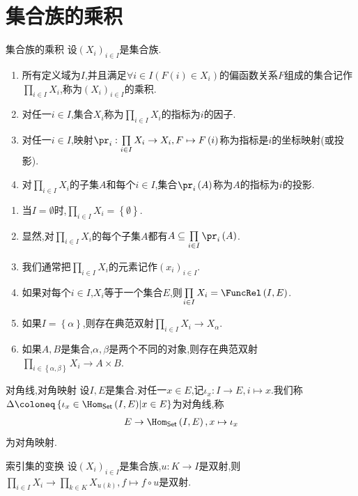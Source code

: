 \section{集合族的乘积}

\begin{definition}{集合族的乘积}{}
	设$\left(X_{i}\right)_{i\in I}$是集合族.
	\begin{enumerate}
		\item 所有定义域为$I$,并且满足$\forall i\in I\left(F\left(i\right)\in X_{i}\right)$的偏函数关系$F$组成的集合记作$\prod\limits_{i\in I}X_{i}$,称为$\left(X_{i}\right)_{i\in I}$的乘积.
		\item 对任一$i\in I$,集合$X_{i}$称为$\prod\limits_{i\in I}X_{i}$的指标为$i$的因子.
		\item 对任一$i\in I$,映射$\pr_{i}:\prod\limits_{i\in I}X_{i}\to X_{i},F\mapsto F\left(i\right)$称为指标是$i$的坐标映射(或投影).
		\item 对$\prod\limits_{i\in I}X_{i}$的子集$A$和每个$i\in I$,集合$\pr_{i}\left(A\right)$称为$A$的指标为$i$的投影.
	\end{enumerate}
\end{definition}

\begin{remark}{}{}
	\begin{enumerate}
		\item 当$I=\emptyset$时,$\prod\limits_{i\in I}X_{i}=\left\{\emptyset\right\}$.
		\item 显然,对$\prod\limits_{i\in I}X_{i}$的每个子集$A$都有$A\subseteq\prod\limits_{i\in I}\pr_{i}\left(A\right)$.
		\item 我们通常把$\prod\limits_{i\in I}X_{i}$的元素记作$\left(x_{i}\right)_{i\in I}$.
		\item 如果对每个$i\in I$,$X_{i}$等于一个集合$E$,则$\prod\limits_{i\in I}X_{i}=\FuncRel\left(I,E\right)$.
		\item 如果$I=\left\{\alpha\right\}$,则存在典范双射$\prod\limits_{i\in I}X_{i}\to X_{\alpha}$.
		\item 如果$A,B$是集合,$\alpha,\beta$是两个不同的对象,则存在典范双射$\prod\limits_{i\in\left\{\alpha,\beta\right\}}X_{i}\to A\times B$.
	\end{enumerate}
\end{remark}

\begin{definition}{对角线,对角映射}{}
	设$I,E$是集合.对任一$x\in E$,记$\iota_{x}:I\to E,i\mapsto x$.我们称$\Delta\coloneq\left\{\iota_{x}\in\Hom_{\mathsf{Set}}\left(I,E\right)\middle|x\in E\right\}$为对角线,称
	\begin{align*}
		E\to\Hom_{\mathsf{Set}}\left(I,E\right),x\mapsto\iota_{x}
	\end{align*}
	为对角映射.
\end{definition}

\begin{proposition}{索引集的变换}{}
	设$\left(X_{i}\right)_{i\in I}$是集合族,$u:K\to I$是双射,则$\prod\limits_{i\in I}X_{i}\to\prod\limits_{k\in K}X_{u\left(k\right)},f\mapsto f\circ u$是双射.
\end{proposition}






















